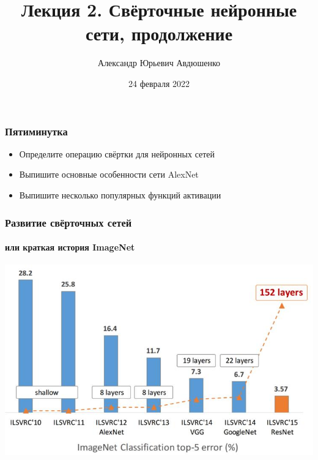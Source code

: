 \documentclass[fullscreen=true, bookmarks=true, hyperref={pdfencoding=unicode}]{beamer}
\title{Лекция 2. Свёрточные нейронные сети, продолжение}
\author{Александр Юрьевич Авдюшенко}
\institute{МКН СПбГУ}
\date{24 февраля 2022}
\begin{document}

\begin{frame}
\transdissolve[duration=0.2]
\titlepage
\end{frame}

\begin{frame}
  \frametitle{Пятиминутка}
  \begin{itemize}
    \item Определите операцию свёртки для нейронных сетей
    \item Выпишите основные особенности сети AlexNet
    \item Выпишите несколько популярных функций активации
  \end{itemize}
\end{frame}


\begin{frame}
  \frametitle{Развитие свёрточных сетей}
  \framesubtitle{или краткая история ImageNet}
  \begin{center}
    \includegraphics[keepaspectratio,
                     width=0.7\paperwidth]{image-net-history.jpg}
  \end{center}
\end{frame}
\end{document}
